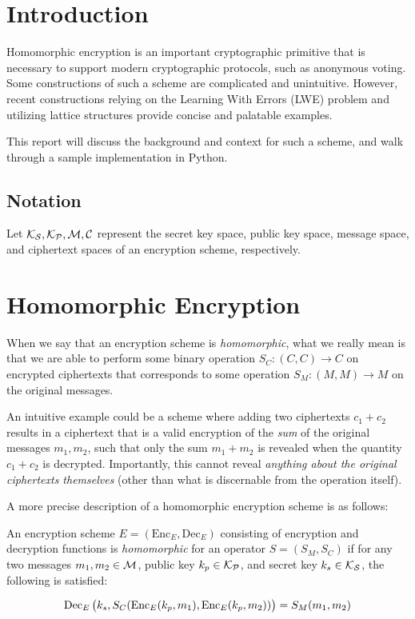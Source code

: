 \documentclass{theme}
\newcommand{\Enc}{\text{Enc}}
\newcommand{\Dec}{\text{Dec}}
\begin{document}
\section{Introduction}

Homomorphic encryption is an important cryptographic primitive that is necessary to support modern cryptographic protocols, such as anonymous voting. Some constructions of such a scheme are complicated and unintuitive. However, recent constructions relying on the Learning With Errors (LWE) problem and utilizing lattice structures provide concise and palatable examples.

This report will discuss the background and context for such a scheme, and walk through a sample implementation in Python.

\subsection{Notation}

Let $\mathcal{K_S}, \mathcal{K_P}, \mathcal{M}, \mathcal{C}$ represent the secret key space, public key space, message space, and ciphertext spaces of an encryption scheme, respectively.

\section{Homomorphic Encryption}

When we say that an encryption scheme is \textit{homomorphic}, what we really mean is that we are able to perform some binary operation $S_C: (C,C) \to C$ on encrypted ciphertexts that corresponds to some operation $S_M: (M, M) \to M$ on the original messages.

An intuitive example could be a scheme where adding two ciphertexts $c_1 + c_2$ results in a ciphertext that is a valid encryption of the \textit{sum} of the original messages $m_1,m_2$, such that only the sum $m_1 + m_2$ is revealed when the quantity $c_1 + c_2$ is decrypted. Importantly, this cannot reveal \textit{anything about the original ciphertexts themselves} (other than what is discernable from the operation itself).

A more precise description of a homomorphic encryption scheme is as follows:

\begin{ndefinition}
    An encryption scheme $E = (\Enc_E, \Dec_E)$ consisting of encryption and decryption functions is \textit{homomorphic} for an operator $S = (S_M, S_C)$ if for any two messages $m_1, m_2 \in \mathcal{M}$, public key $k_p \in \mathcal{K_P}$, and secret key $k_s \in \mathcal{K_S}$, the following is satisfied:

    \begin{equation}
        \Dec_E\p{k_s, S_C(\Enc_E(k_p, m_1), \Enc_E(k_p, m_2))} = S_M(m_1, m_2)
    \end{equation}
\end{ndefinition}
\end{document}
